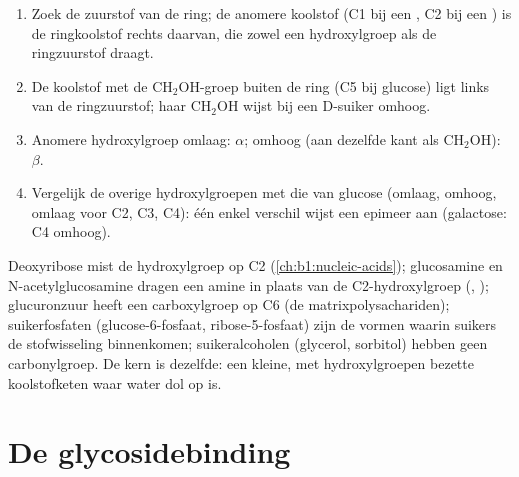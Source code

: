 \begin{method}\label{met:b1:carbohydrates:haworth}
\begin{enumerate}
  \item Zoek de zuurstof van de ring; de anomere koolstof (C1 bij een
        , C2 bij een ) is de ringkoolstof rechts daarvan, die
        zowel een hydroxylgroep als de ringzuurstof draagt.
  \item De koolstof met de $\mathrm{CH_2OH}$-groep buiten de ring (C5 bij
        glucose) ligt links van de ringzuurstof; haar
        $\mathrm{CH_2OH}$ wijst bij een D-suiker omhoog.
  \item Anomere hydroxylgroep omlaag: $\alpha$; omhoog (aan dezelfde kant
        als $\mathrm{CH_2OH}$): $\beta$.
  \item Vergelijk de overige hydroxylgroepen met die van glucose (omlaag,
        omhoog, omlaag voor C2, C3, C4): één enkel verschil wijst een
        epimeer aan (galactose: C4 omhoog).
\end{enumerate}
\end{method}

\begin{example}\label{ex:b1:carbohydrates:derivatives}
Deoxyribose mist de hydroxylgroep op C2 (\cref{ch:b1:nucleic-acids});
glucosamine en N-acetylglucosamine dragen een amine in plaats van de
C2-hydroxylgroep (, ); glucuronzuur heeft een carboxylgroep
op C6 (de matrixpolysachariden); suikerfosfaten (glucose-6-fosfaat,
ribose-5-fosfaat) zijn de vormen waarin suikers de stofwisseling binnenkomen;
suikeralcoholen (glycerol, sorbitol) hebben geen carbonylgroep. De kern is
dezelfde: een kleine, met hydroxylgroepen bezette koolstofketen waar water dol op
is.
\end{example}

\section{De glycosidebinding}

